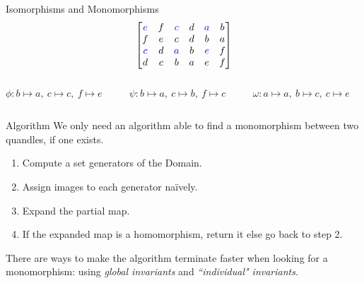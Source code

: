\begin{frame}{Isomorphisms and Monomorphisms}
\[\begin{bmatrix}
     \textcolor{blue}{e}& f& \textcolor{blue}{c}& d& \textcolor{blue}{a}& b \\
     f& e& c& d& b& a \\
     \textcolor{blue}{c}& d& \textcolor{blue}{a}& b& \textcolor{blue}{e}& f \\
     d& c& b& a& e& f 
\end{bmatrix}\]
\begin{columns}
\begin{column}{0.33\linewidth}
\begin{center}
    $\phi: b \mapsto a,~c\mapsto c,~f\mapsto e$\newline
\end{center}
\end{column}
\begin{column}{0.33\linewidth}
\begin{center}
     $\psi: b \mapsto a,~c\mapsto b,~f\mapsto c$\newline
\end{center}
\end{column}
\begin{column}{0.33\linewidth}
\begin{center}
     $\omega: a \mapsto a,~b\mapsto c,~c\mapsto e$\newline
\end{center}
\end{column}
\end{columns}
\end{frame}

\begin{frame}{Algorithm}
We only need an algorithm able to find a monomorphism between two quandles, if one exists. 
\begin{enumerate}
    \item Compute a set generators of the Domain.
    \item Assign images to each generator naïvely.
    \item Expand the partial map.
    \item If the expanded map is a homomorphism, return it else go back to step 2.
\end{enumerate}

There are ways to make the algorithm terminate faster when looking for a monomorphism: using \emph{global invariants} and \emph{``individual" invariants}.

\end{frame}




